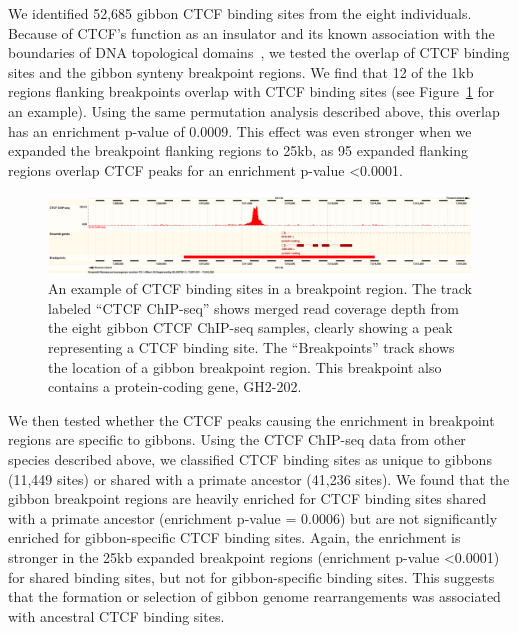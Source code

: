We identified 52,685 gibbon CTCF binding sites from the eight individuals. Because of CTCF's function as an insulator and its known association with the boundaries of DNA topological domains~\cite{Dixon:2012gc}, we tested the overlap of CTCF binding sites and the gibbon synteny breakpoint regions. We find that 12 of the 1kb regions flanking breakpoints overlap with CTCF binding sites (see Figure~\ref{example_ctcf_breakpoint} for an example). Using the same permutation analysis described above, this overlap has an enrichment p-value of 0.0009. This effect was even stronger when we expanded the breakpoint flanking regions to 25kb, as 95 expanded flanking regions overlap CTCF peaks for an enrichment p-value <0.0001.

\begin{figure}
\centering
\includegraphics[width=1\textwidth]{figures/merged_CTCF_GL397331.pdf}
\caption{An example of CTCF binding sites in a breakpoint region. The track labeled ``CTCF ChIP-seq'' shows merged read coverage depth from the eight gibbon CTCF ChIP-seq samples, clearly showing a peak representing a CTCF binding site. The ``Breakpoints'' track shows the location of a gibbon breakpoint region. This breakpoint also contains a protein-coding gene, GH2-202.}
\label{example_ctcf_breakpoint}
\end{figure}

We then tested whether the CTCF peaks causing the enrichment in breakpoint regions are specific to gibbons. Using the CTCF ChIP-seq data from other species described above, we classified CTCF binding sites as unique to gibbons (11,449 sites) or shared with a primate ancestor (41,236 sites). We found that the gibbon breakpoint regions are heavily enriched for CTCF binding sites shared with a primate ancestor (enrichment p-value = 0.0006) but are not significantly enriched for gibbon-specific CTCF binding sites. Again, the enrichment is stronger in the 25kb expanded breakpoint regions (enrichment p-value <0.0001) for shared binding sites, but not for gibbon-specific binding sites. This suggests that the formation or selection of gibbon genome rearrangements was associated with ancestral CTCF binding sites.

